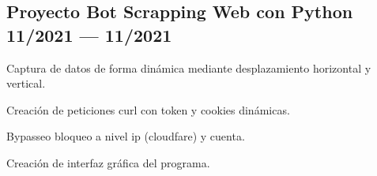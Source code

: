 \documentclass[letter,10pt]{article}
\begin{document}
\subsection{{Proyecto Bot Scrapping Web con Python \hfill 11/2021 --- 11/2021}}
\begin{zitemize}
\item Captura de datos de forma dinámica mediante desplazamiento horizontal y vertical.
\item Creación de peticiones curl con token y cookies dinámicas.
\item Bypasseo bloqueo a nivel ip (cloudfare) y cuenta.
\item Creación de interfaz gráfica del programa.
\end{zitemize}

\end{document}
